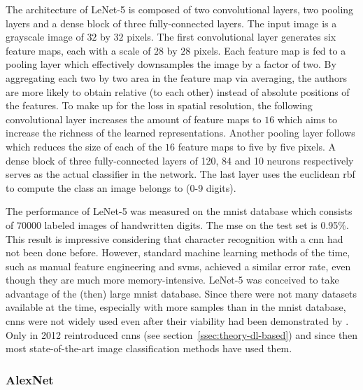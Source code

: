 \documentclass[draft,final]{vutinfth} %
\begin{document}
The architecture of LeNet-5 is composed of two convolutional layers,
two pooling layers and a dense block of three fully-connected
layers. The input image is a grayscale image of $32$ by $32$
pixels. The first convolutional layer generates six feature maps, each
with a scale of $28$ by $28$ pixels. Each feature map is fed to a
pooling layer which effectively downsamples the image by a factor of
two. By aggregating each two by two area in the feature map via
averaging, the authors are more likely to obtain relative (to each
other) instead of absolute positions of the features. To make up for
the loss in spatial resolution, the following convolutional layer
increases the amount of feature maps to $16$ which aims to increase
the richness of the learned representations. Another pooling layer
follows which reduces the size of each of the $16$ feature maps to
five by five pixels. A dense block of three fully-connected layers of
120, 84 and 10 neurons respectively serves as the actual classifier in
the network. The last layer uses the euclidean \gls{rbf} to compute
the class an image belongs to (0-9 digits).

The performance of LeNet-5 was measured on the \gls{mnist} database
which consists of $70000$ labeled images of handwritten digits. The
\gls{mse} on the test set is 0.95\%. This result is impressive
considering that character recognition with a \gls{cnn} had not been
done before. However, standard machine learning methods of the time,
such as manual feature engineering and \glspl{svm}, achieved a similar
error rate, even though they are much more memory-intensive. LeNet-5
was conceived to take advantage of the (then) large \gls{mnist}
database. Since there were not many datasets available at the time,
especially with more samples than in the \gls{mnist} database,
\glspl{cnn} were not widely used even after their viability had been
demonstrated by \textcite{lecun1998}. Only in 2012
\textcite{krizhevsky2012} reintroduced \glspl{cnn} (see
section~\ref{ssec:theory-dl-based}) and since then most
state-of-the-art image classification methods have used them.

\subsubsection{AlexNet}
\label{sssec:theory-alexnet}
\end{document}
